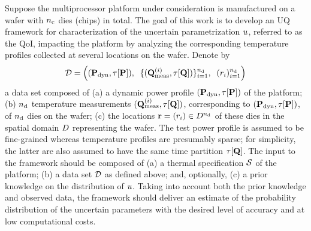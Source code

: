Suppose the multiprocessor platform under consideration is manufactured on a wafer with ${n_{\text{c}}}$ dies (chips) in total. The goal of this work is to develop an UQ framework for characterization of the uncertain parametrization $u$, referred to as the QoI, impacting the platform by analyzing the corresponding temperature profiles collected at several locations on the wafer. Denote by
\[
  \mathcal{D} = \left( (\mathbf{P}_{\text{dyn}}, \tau[\mathbf{P}]), \; \; \{ (\mathbf{Q}^{(i)}_{\text{meas}}, \tau[\mathbf{Q}]) \}_{i = 1}^{n_{\text{d}}}, \; \; ( r_i )_{i = 1}^{n_{\text{d}}} \right)
\]
a data set composed of (a) a dynamic power profile $(\mathbf{P}_{\text{dyn}}, \tau[\mathbf{P}])$ of the platform; (b) ${n_{\text{d}}}$ temperature measurements $(\mathbf{Q}^{(i)}_{\text{meas}}, \tau[\mathbf{Q}])$, corresponding to $(\mathbf{P}_{\text{dyn}}, \tau[\mathbf{P}])$, of ${n_{\text{d}}}$ dies on the wafer; (c) the locations $\mathbf{r} = (r_i) \in D^{n_{\text{d}}}$ of these dies in the spatial domain $D$ representing the wafer. The test power profile is assumed to be fine-grained whereas temperature profiles are presumably sparse; for simplicity, the latter are also assumed to have the same time partition $\tau[\mathbf{Q}]$. The input to the framework should be composed of (a) a thermal specification $\mathcal{S}$ of the platform; (b) a data set $\mathcal{D}$ as defined above; and, optionally, (c) a prior knowledge on the distribution of $u$. Taking into account both the prior knowledge and observed data, the framework should deliver an estimate of the probability distribution of the uncertain parameters with the desired level of accuracy and at low computational costs.

